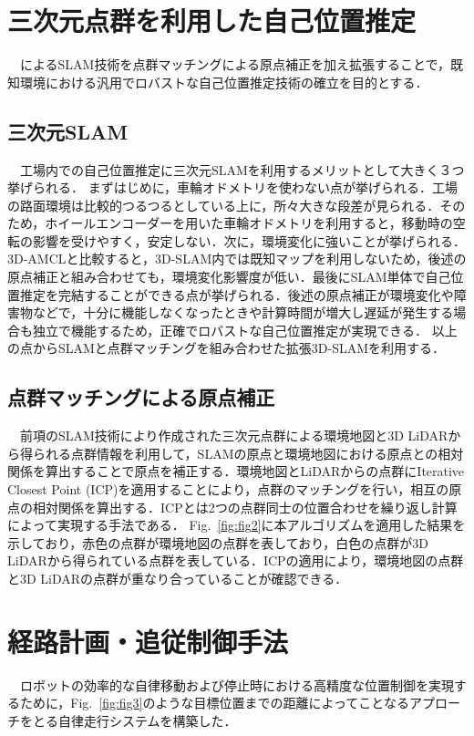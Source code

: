 \section{三次元点群を利用した自己位置推定}\label{sec:self_position}
　\cite{6DSLAM_outside, 3D_SLAM_outside, EKF_SLAM, FAST-LIO, FAST-LIO2}によるSLAM技術を点群マッチングによる原点補正を加え拡張することで，既知環境における汎用でロバストな自己位置推定技術の確立を目的とする．

\subsection{三次元SLAM}
　工場内での自己位置推定に三次元SLAMを利用するメリットとして大きく３つ挙げられる．
まずはじめに，車輪オドメトリを使わない点が挙げられる．工場の路面環境は比較的つるつるとしている上に，所々大きな段差が見られる．そのため，ホイールエンコーダーを用いた車輪オドメトリを利用すると，移動時の空転の影響を受けやすく，安定しない．次に，環境変化に強いことが挙げられる．3D-AMCLと比較すると，3D-SLAM内では既知マップを利用しないため，後述の原点補正と組み合わせても，環境変化影響度が低い．最後にSLAM単体で自己位置推定を完結することができる点が挙げられる．後述の原点補正が環境変化や障害物などで，十分に機能しなくなったときや計算時間が増大し遅延が発生する場合も独立で機能するため，正確でロバストな自己位置推定が実現できる．
以上の点からSLAMと点群マッチングを組み合わせた拡張3D-SLAMを利用する．

\subsection{点群マッチングによる原点補正}
　前項のSLAM技術により作成された三次元点群による環境地図と3D LiDARから得られる点群情報を利用して，SLAMの原点と環境地図における原点との相対関係を算出することで原点を補正する．環境地図とLiDARからの点群にIterative Closest Point (ICP)\cite{ICP}を適用することにより，点群のマッチングを行い，相互の原点の相対関係を算出する．ICPとは2つの点群同士の位置合わせを繰り返し計算によって実現する手法である．
Fig.~\ref{fig:fig2}に本アルゴリズムを適用した結果を示しており，赤色の点群が環境地図の点群を表しており，白色の点群が3D LiDARから得られている点群を表している．ICPの適用により，環境地図の点群と3D LiDARの点群が重なり合っていることが確認できる．

\section{経路計画・追従制御手法}\label{sec:control}
　ロボットの効率的な自律移動および停止時における高精度な位置制御を実現するために，Fig.~\ref{fig:fig3}のような目標位置までの距離によってことなるアプローチをとる自律走行システムを構築した．

